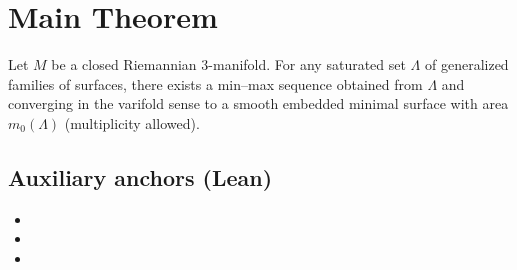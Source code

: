 \chapter{Main Theorem}

\begin{theorem}\label{thm:simon-smith}
Let $M$ be a closed Riemannian $3$-manifold. For any saturated set $\Lambda$ of generalized families of surfaces, there exists a min--max sequence obtained from $\Lambda$ and converging in the varifold sense to a smooth embedded minimal surface with area $m_0(\Lambda)$ (multiplicity allowed).
\end{theorem}

\section*{Auxiliary anchors (Lean)}
\begin{itemize}
  \item {}
  \item {}
  \item {}
\end{itemize}
